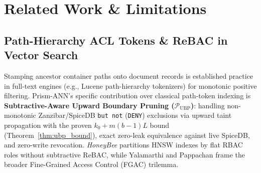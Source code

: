 \documentclass[conference]{IEEEtran}
\begin{document}
\section{Related Work \& Limitations}
\label{sec:related_work}

\subsection{Path-Hierarchy ACL Tokens \& ReBAC in Vector Search}
Stamping ancestor container paths onto document records is established practice in full-text engines (e.g., Lucene path-hierarchy tokenizers) for monotonic positive filtering. Prism-ANN's specific contribution over classical path-token indexing is \textbf{Subtractive-Aware Upward Boundary Pruning ($\mathcal{P}_{\text{UBP}}$)}: handling non-monotonic Zanzibar/SpiceDB \texttt{but not} (\texttt{DENY}) exclusions via upward taint propagation with the proven $k_0 + m(b-1)L$ bound (Theorem~\ref{thm:ubp_bound}), exact zero-leak equivalence against live SpiceDB, and zero-write revocation. \textit{HoneyBee} \cite{zhong2025honeybee} partitions HNSW indexes by flat RBAC roles without subtractive ReBAC, while Yalamarthi and Pappachan \cite{yalamarthi2026policy} frame the broader Fine-Grained Access Control (FGAC) trilemma.
\end{document}

